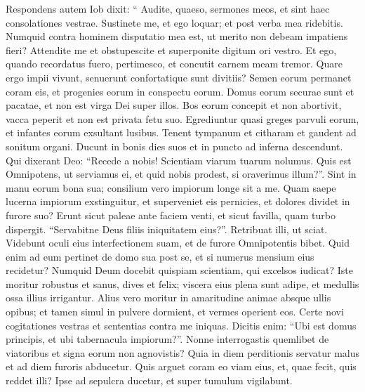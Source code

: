 \begin{biblechapter}
\begin{biblechapter}
\begin{biblechapter}
\begin{biblechapter}
\begin{biblechapter}
\begin{biblechapter}
\begin{biblechapter}
\begin{biblechapter}
\begin{biblechapter}
\begin{biblechapter}
\begin{biblechapter}
\begin{biblechapter}
\begin{biblechapter}
\begin{biblechapter}
\begin{biblechapter}
\begin{biblechapter}
\begin{biblechapter}
\begin{biblechapter}
\begin{biblechapter}
\begin{biblechapter}
\begin{biblechapter}
\verse Respondens autem Iob dixit:
 \verse “ Audite, quaeso, sermones
 meos,
 et sint haec consolationes vestrae.
 \verse Sustinete me, et ego loquar;
 et post verba mea ridebitis.
 \verse Numquid contra hominem disputatio mea est,
 ut merito non debeam impatiens fieri?
 \verse Attendite me et obstupescite
 et superponite digitum ori vestro.
 \verse Et ego, quando recordatus fuero, pertimesco,
 et concutit carnem meam tremor.
 \verse Quare ergo impii vivunt,
 senuerunt confortatique sunt divitiis?
 \verse Semen eorum permanet coram eis,
 et progenies eorum in conspectu eorum.
 \verse Domus eorum securae sunt et pacatae,
 et non est virga Dei super illos.
 \verse Bos eorum concepit et non abortivit,
 vacca peperit et non est privata fetu suo.
 \verse Egrediuntur quasi greges parvuli eorum,
 et infantes eorum exsultant lusibus.
 \verse Tenent tympanum et citharam
 et gaudent ad sonitum organi.
 \verse Ducunt in bonis dies suos
 et in puncto ad inferna descendunt.
 \verse Qui dixerant Deo: “Recede a nobis!
 Scientiam viarum tuarum nolumus.
 \verse Quis est Omnipotens, ut serviamus ei,
 et quid nobis prodest, si oraverimus illum?”.
 \verse Sint in manu eorum bona sua;
 consilium vero impiorum longe sit a me.
 \verse Quam saepe lucerna impiorum exstinguitur,
 et superveniet eis pernicies,
 et dolores dividet in furore suo?
 \verse Erunt sicut paleae ante faciem venti,
 et sicut favilla, quam turbo dispergit.
 \verse “Servabitne Deus filiis iniquitatem eius?”.
 Retribuat illi, ut sciat.
 \verse Videbunt oculi eius interfectionem suam,
 et de furore Omnipotentis bibet.
 \verse Quid enim ad eum pertinet de domo sua post se,
 et si numerus mensium eius recidetur?
 \verse Numquid Deum docebit quispiam scientiam,
 qui excelsos iudicat?
 \verse Iste moritur robustus et sanus,
 dives et felix;
 \verse viscera eius plena sunt adipe,
 et medullis ossa illius irrigantur.
 \verse Alius vero moritur in amaritudine animae
 absque ullis opibus;
 \verse et tamen simul in pulvere dormient,
 et vermes operient eos.
 \verse Certe novi cogitationes vestras
 et sententias contra me iniquas.
 \verse Dicitis enim: “Ubi est domus principis,
 et ubi tabernacula impiorum?”.
 \verse Nonne interrogastis quemlibet de viatoribus
 et signa eorum non agnovistis?
 \verse Quia in diem perditionis servatur malus
 et ad diem furoris abducetur.
 \verse Quis arguet coram eo viam eius,
 et, quae fecit, quis reddet illi?
 \verse Ipse ad sepulcra ducetur,
 et super tumulum vigilabunt.

\end{biblechapter}
\end{biblechapter}
\end{biblechapter}
\end{biblechapter}
\end{biblechapter}
\end{biblechapter}
\end{biblechapter}
\end{biblechapter}
\end{biblechapter}
\end{biblechapter}
\end{biblechapter}
\end{biblechapter}
\end{biblechapter}
\end{biblechapter}
\end{biblechapter}
\end{biblechapter}
\end{biblechapter}
\end{biblechapter}
\end{biblechapter}
\end{biblechapter}
\end{biblechapter}
